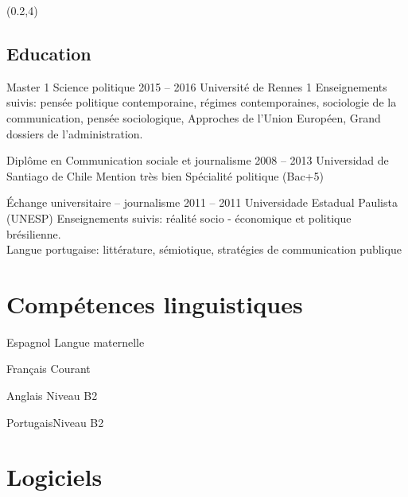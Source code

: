 \documentclass{tccv}
\begin{document}
\begin{textblock}{7}(0.2,4)
\begin{mdframed}

\section{Education}
\begin{yearlist}

\item[Master 1 Science politique]{2015 -- 2016}
     {Université de Rennes 1}
     {Enseignements suivis: pensée politique contemporaine, 
     régimes contemporaines, sociologie de la communication, pensée sociologique, Approches de l'Union Européen, Grand dossiers de l'administration.}


  

\item[Diplôme en Communication sociale et journalisme]{2008 -- 2013}
     {Universidad de Santiago de Chile}
     {Mention très bien
      Spécialité politique
      (Bac+5)}

     
\item[Échange universitaire -- journalisme]{2011 -- 2011}
     {Universidade Estadual Paulista (UNESP)}
     {Enseignements suivis: réalité socio - économique et politique brésilienne. \\
     Langue portugaise: littérature, sémiotique, stratégies de communication publique}


\end{yearlist}
\end{mdframed}


\begin{mdframed}
\section{Compétences linguistiques}

\begin{factlist}
\item{Espagnol} {Langue maternelle}	
\item{Français} {Courant}	
\item{Anglais}  {Niveau B2}	
\item{Portugais}{Niveau B2}
\end{factlist}

\section{Logiciels}
\end{mdframed}
\end{textblock}
\end{document}
